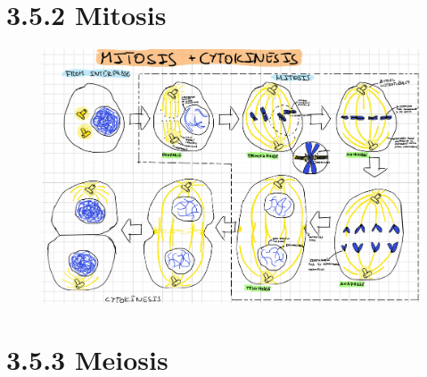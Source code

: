 \documentclass[a4paper,landscape,10pt]{cheatsheet}
\begin{document}
\pagebreak
\section*{3.5.2 Mitosis}
\begin{figure}[H]
\includegraphics*[width=700px]{images/mitosis.png}
      
\end{figure}
\pagebreak
\section*{3.5.3 Meiosis}
\end{document}
